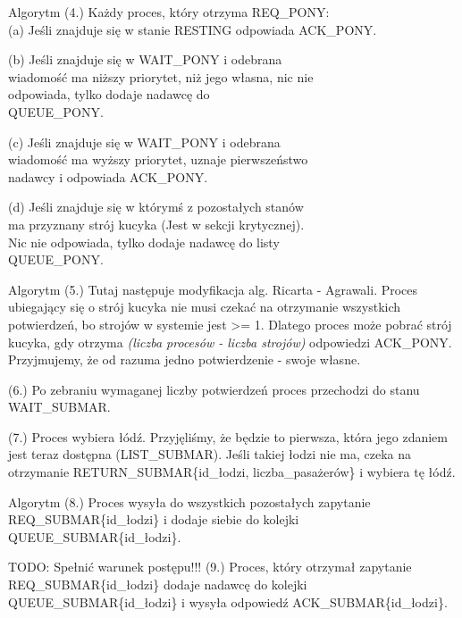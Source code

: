 \documentclass{beamer}
\newcommand\tab[1][1cm]{\hspace*{#1}}
\begin{document}
\begin{frame}{Algorytm}
    \internallinenumbers
    (4.) Każdy proces, który otrzyma REQ\_PONY: \\
        \tab[0.4cm] (a) Jeśli znajduje się w stanie RESTING odpowiada
        \tab[1cm] ACK\_PONY.

        \tab[0.4cm] (b) Jeśli znajduje się w WAIT\_PONY i odebrana\\
        \tab[1cm] wiadomość ma niższy priorytet, niż jego własna, nic nie\\
        \tab[1cm] odpowiada, tylko dodaje nadawcę do\\
        \tab[1cm] QUEUE\_PONY.
        
        \tab[0.4cm] (c) Jeśli znajduje się w WAIT\_PONY i odebrana\\
        \tab[1cm] wiadomość ma wyższy priorytet, uznaje pierwszeństwo  \\
        \tab[1cm] nadawcy i odpowiada ACK\_PONY.

        \tab[0.4cm] (d) Jeśli znajduje się w którymś z pozostałych stanów \\
        \tab[1cm] ma przyznany strój kucyka (Jest w sekcji krytycznej). \\
        \tab[1cm] Nic nie odpowiada, tylko dodaje nadawcę do listy \\
        \tab[1cm] QUEUE\_PONY.
\end{frame}

\begin{frame}{Algorytm}
    \internallinenumbers
    (5.) Tutaj następuje modyfikacja alg. Ricarta - Agrawali. Proces ubiegający się o strój kucyka nie musi czekać na otrzymanie wszystkich potwierdzeń, bo strojów w systemie jest >= 1. Dlatego proces może pobrać strój kucyka, gdy otrzyma \textit{(liczba procesów - liczba strojów)} odpowiedzi ACK\_PONY. Przyjmujemy, że od razuma jedno potwierdzenie - swoje własne.

    \vspace{0.5cm}
    (6.) Po zebraniu wymaganej liczby potwierdzeń proces przechodzi do stanu WAIT\_SUBMAR.

    \vspace{0.5cm}
    (7.) Proces wybiera łódź. Przyjęliśmy, że będzie to pierwsza, która jego zdaniem jest teraz dostępna (LIST\_SUBMAR). Jeśli takiej łodzi nie ma, czeka na otrzymanie RETURN\_SUBMAR\{id\_łodzi, liczba\_pasażerów\} i wybiera tę łódź.
\end{frame}

\begin{frame}{Algorytm}
    \internallinenumbers
    (8.) Proces wysyła do wszystkich pozostałych zapytanie REQ\_SUBMAR\{id\_łodzi\} i dodaje siebie do kolejki QUEUE\_SUBMAR\{id\_łodzi\}.

    \vspace{0.5cm}
    TODO: Spełnić warunek postępu!!!
    (9.) Proces, który otrzymał zapytanie REQ\_SUBMAR\{id\_łodzi\} dodaje nadawcę do kolejki QUEUE\_SUBMAR\{id\_łodzi\} i wysyła odpowiedź ACK\_SUBMAR\{id\_łodzi\}.

\end{frame}
\end{document}
